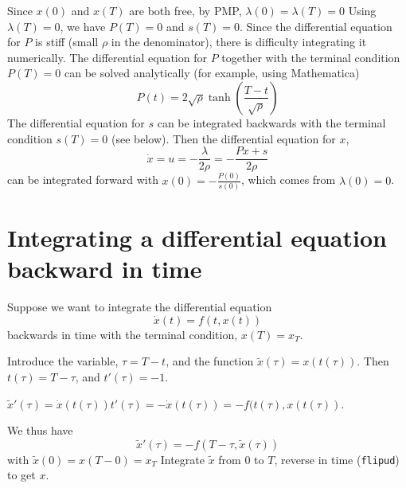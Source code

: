 \documentclass[11pt]{article}
\begin{document}
Since $x(0)$ and $x(T)$ are both free, by PMP, $\lambda(0) = \lambda(T) = 0$
Using $\lambda(T) = 0$, we have $P(T) = 0$ and $s(T) = 0$.
Since the differential equation for $P$ is stiff (small $\rho$ in the denominator), 
there is difficulty integrating it numerically. The differential equation
for $P$ together with the terminal condition $P(T) = 0$ can be solved 
analytically (for example, using Mathematica)
\begin{equation*}
    P(t) = 2\sqrt{\rho} \tanh\left(\frac{T-t}{\sqrt{\rho}}\right)
\end{equation*}
The differential equation for $s$ can be integrated backwards 
with the terminal condition $s(T) = 0$ (see below).
Then the differential equation for $x$,
\begin{equation*}
    \dot{x} = u = -\frac{\lambda}{2\rho} = -\frac{Px + s}{2\rho}
\end{equation*}
can be integrated forward with $x(0) = -\frac{P(0)}{s(0)}$,
which comes from $\lambda(0) = 0$.

\section{Integrating a differential equation backward in time}
Suppose we want to integrate the differential equation
\begin{equation*}
    \dot{x}(t) = f(t,x(t))
\end{equation*}
backwards in time with the terminal condition, $x(T) = x_T$.

Introduce the variable, $\tau = T-t$, and the function $\tilde{x}(\tau) = x(t(\tau))$.
Then $t(\tau) = T-\tau$, and $t'(\tau) = -1$.

$\tilde{x}'(\tau) = \dot{x}(t(\tau))t'(\tau) = -\dot{x}(t(\tau)) = -f(t(\tau),x(t(\tau))$.

We thus have
\begin{equation*}
    \tilde{x}'(\tau) = -f(T-\tau,\tilde{x}(\tau))
\end{equation*}
with $\tilde{x}(0) = x(T-0) = x_T$
Integrate $\tilde{x}$ from $0$ to $T$, reverse in time (\texttt{flipud}) to get $x$.
\end{document}
